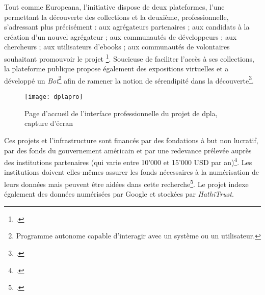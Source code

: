 Tout comme Europeana, l'initiative dispose de deux plateformes, l'une permettant la découverte des collections et la deuxième, professionnelle, s'adressant plus précisément : aux agrégateurs partenaires ; aux candidats à la création d'un nouvel agrégateur ; aux communautés de développeurs ; aux chercheurs ; aux utilisateurs d'ebooks ; aux communautés de volontaires souhaitant promouvoir le projet \footcite{digital_public_library_of_america_our_nodate}. Soucieuse de faciliter l'accès à ses collections, la plateforme publique propose également des expositions virtuelles et a développé un \textit{Bot}\footnote{Programme autonome capable d'interagir avec un système ou un utilisateur.} afin de ramener la notion de sérendipité dans la découverte\footcite{thylstrup_politics_2018}.

 \begin{figure}[H]%
\centering
\texttt{[image: dplapro]}
\caption{Page d'accueil de l'interface professionnelle du projet de \gls{dpla}, capture d'écran}
\end{figure}

Ces projets et l'infrastructure sont financés par des fondations à but non lucratif, par des fonds du gouvernement américain et par une redevance prélevée auprès des institutions partenaires (qui varie entre 10'000 et 15'000 USD par an)\footcite{digital_public_library_of_america_membership_nodate}. Les institutions doivent elles-mêmes assurer les fonds nécessaires à la numérisation de leurs données mais peuvent être aidées dans cette recherche\footcite{digital_public_library_of_america_our_nodate-1}. Le projet indexe également des données numérisées par Google et stockées par \textit{HathiTrust}.

